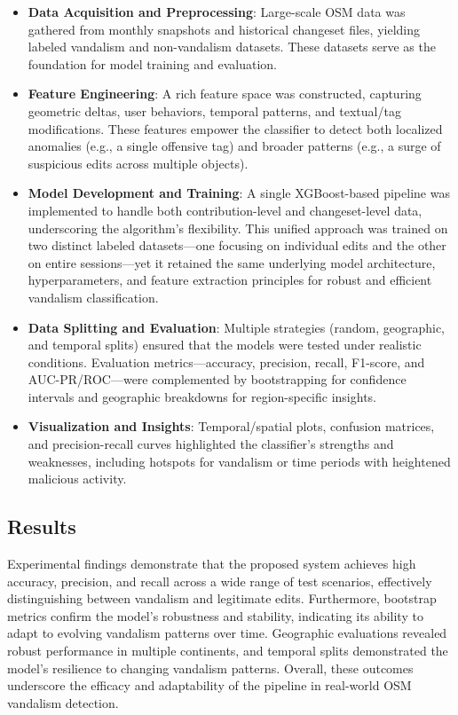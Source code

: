 \documentclass[
    13pt, %
    a4paper, %
    listof=totoc, %
    bibliography=totoc, %
    index=totoc, %
    headsepline
]{scrreprt}
\begin{document}
\begin{itemize}
  \item \textbf{Data Acquisition and Preprocessing}: Large-scale OSM data was gathered from monthly snapshots and historical changeset files, yielding labeled vandalism and non-vandalism datasets. These datasets serve as the foundation for model training and evaluation.
  \item \textbf{Feature Engineering}: A rich feature space was constructed, capturing geometric deltas, user behaviors, temporal patterns, and textual/tag modifications. These features empower the classifier to detect both localized anomalies (e.g., a single offensive tag) and broader patterns (e.g., a surge of suspicious edits across multiple objects).
  \item \textbf{Model Development and Training}: A single XGBoost-based pipeline was implemented to handle both contribution-level and changeset-level data, underscoring the algorithm’s flexibility. This unified approach was trained on two distinct labeled datasets—one focusing on individual edits and the other on entire sessions—yet it retained the same underlying model architecture, hyperparameters, and feature extraction principles for robust and efficient vandalism classification.
  \item \textbf{Data Splitting and Evaluation}: Multiple strategies (random, geographic, and temporal splits) ensured that the models were tested under realistic conditions. Evaluation metrics—accuracy, precision, recall, F1-score, and AUC-PR/ROC—were complemented by bootstrapping for confidence intervals and geographic breakdowns for region-specific insights.
  \item \textbf{Visualization and Insights}: Temporal/spatial plots, confusion matrices, and precision-recall curves highlighted the classifier’s strengths and weaknesses, including hotspots for vandalism or time periods with heightened malicious activity.
\end{itemize}

\subsection*{Results}
\noindent
Experimental findings demonstrate that the proposed system achieves high accuracy, precision, and recall across a wide range of test scenarios, effectively distinguishing between vandalism and legitimate edits. Furthermore, bootstrap metrics confirm the model’s robustness and stability, indicating its ability to adapt to evolving vandalism patterns over time. Geographic evaluations revealed robust performance in multiple continents, and temporal splits demonstrated the model’s resilience to changing vandalism patterns. Overall, these outcomes underscore the efficacy and adaptability of the pipeline in real-world OSM vandalism detection.
\end{document}
